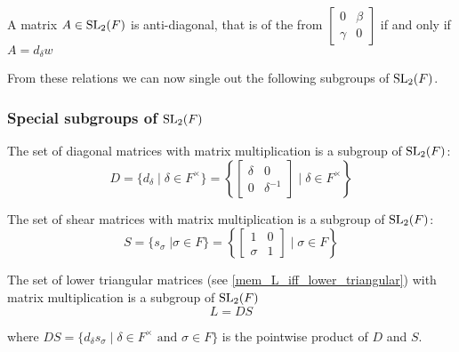 \begin{remark}
    \label{SpecialLinearGroup.fin_two_antidiagonal_iff}
    \leanok
    A matrix $A \in \operatorname{SL}_2(F)$ is anti-diagonal, that is of the from $\begin{bmatrix}
        0 & \beta\\
        \gamma & 0
    \end{bmatrix}$ if and only if $A = d_\delta w$
    
\end{remark}

From these relations we can now single out the following subgroups of $\operatorname{SL}_2(F)$.

\subsubsection{Special subgroups of $\operatorname{SL}_2(F)$}

\begin{definition}
\label{SpecialSubgroups.D}
\leanok
    The set of diagonal matrices with matrix multiplication is a subgroup of $\operatorname{SL}_2(F)$: 
    \[
    D = \{d_\delta \; | \; \delta \in F^\times \} = \left\{ \begin{bmatrix}\delta & 0\\ 0 & \delta^{-1}\end{bmatrix} \; | \; \delta \in F^\times \right\}
    \]
\end{definition}

\begin{definition}
\label{SpecialSubgroups.S}
\leanok
    The set of shear matrices with matrix multiplication is a subgroup of $\operatorname{SL}_2(F)$:
    \[
    S = \{s_\sigma \; | \sigma \in F\} = \left\{\begin{bmatrix}1 & 0\\ \sigma & 1\end{bmatrix} \; | \; \sigma \in F \right\}
    \]
\end{definition}

\begin{definition}
\label{SpecialSubgroups.L}
\leanok
    The set of lower triangular matrices (see \ref{mem_L_iff_lower_triangular}) with matrix multiplication is a subgroup of $\operatorname{SL}_2(F)$
    \[
    L = DS
    \]

    where $DS = \{d_\delta s_\sigma \; | \; \delta \in F^\times \text{ and } \sigma \in F \}$ is the pointwise product of $D$ and $S$.
\end{definition}

